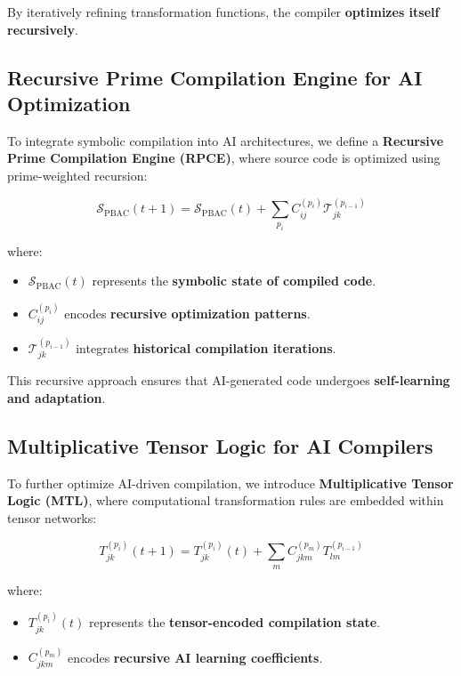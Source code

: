 \documentclass{article}
\theoremstyle{plain}
\theoremstyle{plain}
\theoremstyle{definition}
\theoremstyle{remark}
\begin{document}
By iteratively refining transformation functions, the compiler \textbf{optimizes itself recursively}.

\subsection{Recursive Prime Compilation Engine for AI Optimization}

To integrate symbolic compilation into AI architectures, we define a \textbf{Recursive Prime Compilation Engine (RPCE)}, where source code is optimized using prime-weighted recursion:

\begin{equation}
\mathcal{S}_{\text{PBAC}}(t+1) = \mathcal{S}_{\text{PBAC}}(t) + \sum_{p_i} C_{ij}^{(p_i)} \mathcal{T}_{jk}^{(p_{i-1})}
\end{equation}

where:
\begin{itemize}
    \item $\mathcal{S}_{\text{PBAC}}(t)$ represents the \textbf{symbolic state of compiled code}.
    \item $C_{ij}^{(p_i)}$ encodes \textbf{recursive optimization patterns}.
    \item $\mathcal{T}_{jk}^{(p_{i-1})}$ integrates \textbf{historical compilation iterations}.
\end{itemize}

This recursive approach ensures that AI-generated code undergoes \textbf{self-learning and adaptation}.

\subsection{Multiplicative Tensor Logic for AI Compilers}

To further optimize AI-driven compilation, we introduce \textbf{Multiplicative Tensor Logic (MTL)}, where computational transformation rules are embedded within tensor networks:

\begin{equation}
T_{jk}^{(p_i)}(t+1) = T_{jk}^{(p_i)}(t) + \sum_{m} C_{jkm}^{(p_m)} T_{lm}^{(p_{i-1})}
\end{equation}

where:
\begin{itemize}
    \item $T_{jk}^{(p_i)}(t)$ represents the \textbf{tensor-encoded compilation state}.
    \item $C_{jkm}^{(p_m)}$ encodes \textbf{recursive AI learning coefficients}.
\end{itemize}
\end{document}
